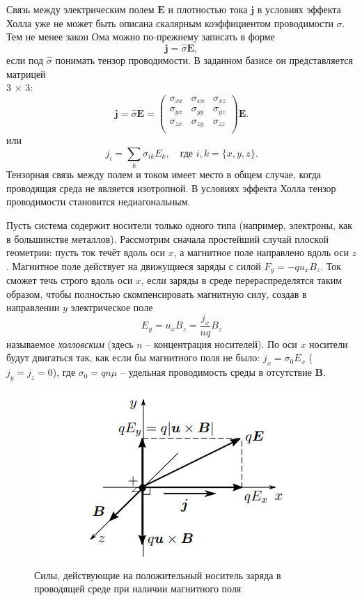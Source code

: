 \documentclass[a4paper,12pt]{article}
\begin{document}
Связь между электрическим полем $\mathbf{E}$ и плотностью тока $\mathbf{j}$ в условиях эффекта Холла уже не может быть описана скалярным коэффициентом
проводимости $\sigma$. Тем не менее закон Ома можно по-прежнему записать в форме
\[\mathbf{j} = \hat{\sigma} \mathbf{E},\]
если под $\hat{\sigma}$ понимать тензор проводимости. В заданном базисе он
представляется матрицей \\ 3 $\times$ 3:
\begin{equation}
    \mathbf{j} = \hat{\sigma} \mathbf{E} = 
        \begin{pmatrix}
                \sigma_{xx} & \sigma_{xx} & \sigma_{xz} \\
                \sigma_{yx} & \sigma_{yy} & \sigma_{yz} \\
                \sigma_{zx} & \sigma_{zy} & \sigma_{zz} \\
        \end{pmatrix} \mathbf{E}.
\end{equation}
или
\[j_i = \sum_k \sigma_{ik} E_k, \quad \text{где } i, k = \{x, y, z\}.\]
Тензорная связь между полем и током имеет место в общем случае, когда проводящая среда не является изотропной. В условиях эффекта Холла тензор проводимости становится недиагональным.

Пусть система содержит носители только одного типа (например,
электроны, как в большинстве металлов). Рассмотрим сначала простейший случай плоской геометрии: пусть ток течёт вдоль оси $x$, а магнитное поле направлено вдоль оси $z$. Магнитное поле действует на движущиеся заряды с силой $F_y = -q u_x B_z$.  Ток сможет течь строго вдоль оси $x$, если заряды в среде перераспределятся таким образом, чтобы полностью скомпенсировать магнитную силу, создав в направлении $y$ электрическое поле
\[E_y = u_x B_z = \frac{j_x}{nq} B_z\]
называемое \textit{холловским} (здесь $n$ -- концентрация носителей). По оси
$x$ носители будут двигаться так, как если бы магнитного поля не было:
$j_x = \sigma_0 E_x$ ($j_y = j_z = 0$), где $\sigma_0 = q n \mu$ -- удельная проводимость среды в отсутствие $\mathbf{B}$.
\begin{figure}[H]\label{fig: electron in B and E}
    \centering
    \includegraphics[scale = 0.95]{Частица в полях.png}
    \caption{Силы, действующие на положительный носитель заряда в проводящей среде при наличии магнитного поля}
\end{figure}
\end{document}
